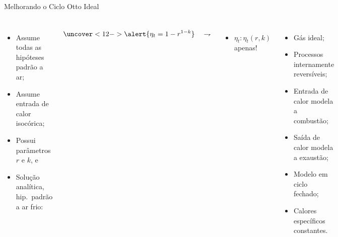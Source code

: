     \begin{frame}{Melhorando o Ciclo Otto Ideal}\vspace*{-2em}
        \begin{columns}
        \begin{itemize}
            \item<2->  Assume todas as \alert{hipóteses padrão a ar};
            \item<8->  Assume entrada de calor \alert{isocórica};
            \item<9->  Possui parâmetros \alert{$r$} e \alert{$k$}, e
            \item<10-> Solução analítica, \alert{hip.~padrão a ar frio}:\\[\bigskipamount]
        \end{itemize}
        \begin{equation*}
            \uncover<12->{\alert{\eta_t = 1 - r^{1-k}}\quad\rightharpoondown}
        \end{equation*}%
        \vspace*{-1em}
        \begin{itemize}
            \item<13-> $\eta_t\!:\!\eta_t(r, k)$ \alert{apenas}!
        \end{itemize}
        \begin{itemize}
            \item<3->  Gás \alert{ideal};
            \item<4->  Processos \alert{internamente reversíveis};
            \item<5->  Entrada de \alert{calor} modela a combustão;
            \item<6->  Saída de \alert{calor} modela a exaustão;
            \item<7->  Modelo em \alert{ciclo fechado};
            \item<11-> Calores específicos \alert{constantes}.
        \end{itemize}
        \end{columns}
    \end{frame}

